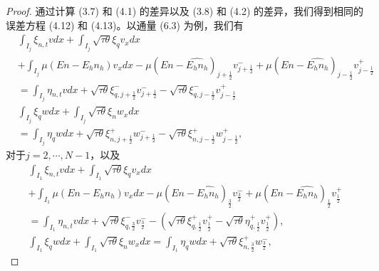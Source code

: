 \begin{proof}
    通过计算 (3.7) 和 (4.1) 的差异以及 (3.8) 和 (4.2) 的差异，我们得到相同的误差方程 (4.12) 和 (4.13)。以通量 (6.3) 为例，我们有
    $$
        \begin{aligned}
             & \int_{I_{j}} \xi_{n, t} v d x+\int_{I_{j}} \sqrt{\tau \theta} \xi_{q} v_{x} d x                                                                                                                                         \\
             & +\int_{I_{j}} \mu\left(E n-E_{h} n_{h}\right) v_{x} d x-\mu\left(E n-\widehat{E_{h} n_{h}}\right)_{j+\frac{1}{2}} v_{j+\frac{1}{2}}^{-}+\mu\left(E n-\widehat{E_{h} n_{h}}\right)_{j-\frac{1}{2}} v_{j-\frac{1}{2}}^{+} \\
             & =\int_{I_{j}} \eta_{n, t} v d x+\sqrt{\tau \theta} \xi_{q, j+\frac{1}{2}}^{-} v_{j+\frac{1}{2}}^{-}-\sqrt{\tau \theta} \xi_{q, j-\frac{1}{2}}^{-} v_{j-\frac{1}{2}}^{+}                                                 \\
             & \int_{I_{j}} \xi_{q} w d x+\int_{I_{j}} \sqrt{\tau \theta} \xi_{n} w_{x} d x                                                                                                                                            \\
             & =\int_{I_{j}} \eta_{q} w d x+\sqrt{\tau \theta} \xi_{n, j+\frac{1}{2}}^{+} w_{j+\frac{1}{2}}^{-}-\sqrt{\tau \theta} \xi_{n, j-\frac{1}{2}}^{+} w_{j-\frac{1}{2}}^{+},
        \end{aligned}
    $$
    对于$j=2, \cdots, N-1$，以及
    \begin{gather*}
        \int_{I_{1}} \xi_{n, t} v d x+\int_{I_{1}} \sqrt{\tau \theta} \xi_{q} v_{x} d x                                                                                                                                                                  \\
        +\int_{I_{1}} \mu\left(E n-E_{h} n_{h}\right) v_{x} d x-\mu\left(E n-\widehat{E_{h} n_{h}}\right)_{\frac{3}{2}} v_{\frac{3}{2}}^{-}+\mu\left(E n-\widehat{E_{h} n_{h}}\right)_{\frac{1}{2}} v_{\frac{1}{2}}^{+}                                  \\
        =  \int_{I_{1}} \eta_{n, t} v d x+\sqrt{\tau \theta} \xi_{q, \frac{3}{2}}^{-} v_{\frac{3}{2}}^{-}-\left(\sqrt{\tau \theta} \xi_{q, \frac{1}{2}}^{+} v_{\frac{1}{2}}^{+}-\sqrt{\tau \theta} \eta_{q, \frac{1}{2}}^{+} v_{\frac{1}{2}}^{+}\right), \\
        \int_{I_{1}} \xi_{q} w d x+\int_{I_{1}} \sqrt{\tau \theta} \xi_{n} w_{x} d x=\int_{I_{1}} \eta_{q} w d x+\sqrt{\tau \theta} \xi_{n, \frac{3}{2}}^{+} w_{\frac{3}{2}}^{-},

\end{gather*}
\end{proof}
